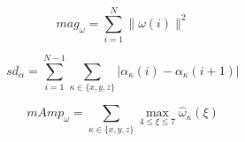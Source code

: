 \begin{equation}
mag_{\omega} = \sum_{i=1}^{N} \|\omega(i)\|^{2}
\end{equation}

\begin{equation}
sd_{\alpha} = \sum_{i=1}^{N-1}\sum_{\kappa \in \{x,y,z\}} |\alpha_{\kappa}(i) - \alpha_{\kappa}(i+1)|
\end{equation}

\begin{equation}
mAmp_{\omega} = \sum_{\kappa \in \{x,y,z\}} \max_{4 \leq \xi \leq 7} \hat{\omega}_{\kappa}(\xi)
\end{equation}



